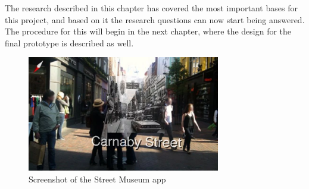 The research described in this chapter has covered the most important bases for this project, and based on it the research questions can now start being answered. The procedure for this will begin in the next chapter, where the design for the final prototype is described as well.

\vfill
\begin{figure}[h!]
    \centering
    \includegraphics[width=0.75\textwidth]{figures/Streetmuseum.png}
    \caption{Screenshot of the Street Museum app \cite{Brothers}}\label{fig:streetmuseum}
\end{figure}


